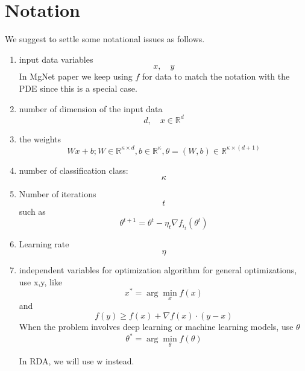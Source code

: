 \chapter*{Notation}

We suggest to settle some notational issues as follows. 
\begin{enumerate}
\item input data variables
  \begin{equation}
    \label{eq:1}
x, \quad y    
  \end{equation}
In MgNet paper we keep using $f$ for data to match the notation
with the PDE since this is a special case.
\item number of dimension of the input data
  \begin{equation}
    \label{dim}
d, \quad x\in \mathbb R^d    
  \end{equation}
\item the weights
  \begin{equation}
    \label{weights}
Wx+b; W\in\mathbb R^{\kappa\times d}, b\in \mathbb R^\kappa,
\theta=(W,b)\in\mathbb R^{\kappa\times(d+1)}
\end{equation}
\item number of classification class:
  \begin{equation}
    \label{k} \kappa    
  \end{equation}
\item Number of iterations
  \begin{equation}
    \label{iterations}
t
  \end{equation}
such as
$$
\theta^{t+1}=\theta^t-\eta_t \nabla f_{i_t}(\theta^t)
$$
\item Learning rate
  \begin{equation}
    \label{learningrate}
\eta    
  \end{equation}

\item independent variables for optimization algorithm
for general optimizations, use x,y, like
$$
x^*=\arg\min_{x}f(x)
$$
and
$$
f(y)\ge f(x)+\nabla f(x)\cdot (y-x)
$$
When the problem involves deep learning or machine learning  models, use $\theta$
$$
\theta^*=\arg\min_{\theta}f(\theta)
$$
\begin{remark}
In RDA, we will use w instead.
\end{remark}


\end{enumerate}


